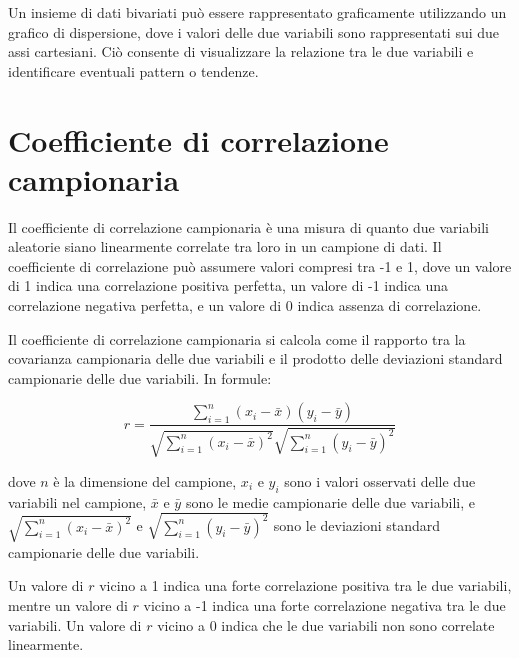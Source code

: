 Un insieme di dati bivariati può essere rappresentato graficamente utilizzando un grafico di dispersione, dove i valori delle due variabili sono rappresentati sui due assi cartesiani. Ciò consente di visualizzare la relazione tra le due variabili e identificare eventuali pattern o tendenze.
\section{Coefficiente di correlazione campionaria}

Il coefficiente di correlazione campionaria è una misura di quanto due variabili aleatorie siano linearmente correlate tra loro in un campione di dati. Il coefficiente di correlazione può assumere valori compresi tra -1 e 1, dove un valore di 1 indica una correlazione positiva perfetta, un valore di -1 indica una correlazione negativa perfetta, e un valore di 0 indica assenza di correlazione.

Il coefficiente di correlazione campionaria si calcola come il rapporto tra la covarianza campionaria delle due variabili e il prodotto delle deviazioni standard campionarie delle due variabili. In formule:

$$r = \frac{\sum_{i=1}^n (x_i - \bar{x})(y_i - \bar{y})}{\sqrt{\sum_{i=1}^n (x_i - \bar{x})^2}\sqrt{\sum_{i=1}^n (y_i - \bar{y})^2}}$$

dove $n$ è la dimensione del campione, $x_i$ e $y_i$ sono i valori osservati delle due variabili nel campione, $\bar{x}$ e $\bar{y}$ sono le medie campionarie delle due variabili, e $\sqrt{\sum_{i=1}^n (x_i - \bar{x})^2}$ e $\sqrt{\sum_{i=1}^n (y_i - \bar{y})^2}$ sono le deviazioni standard campionarie delle due variabili.

Un valore di $r$ vicino a 1 indica una forte correlazione positiva tra le due variabili, mentre un valore di $r$ vicino a -1 indica una forte correlazione negativa tra le due variabili. Un valore di $r$ vicino a 0 indica che le due variabili non sono correlate linearmente.




